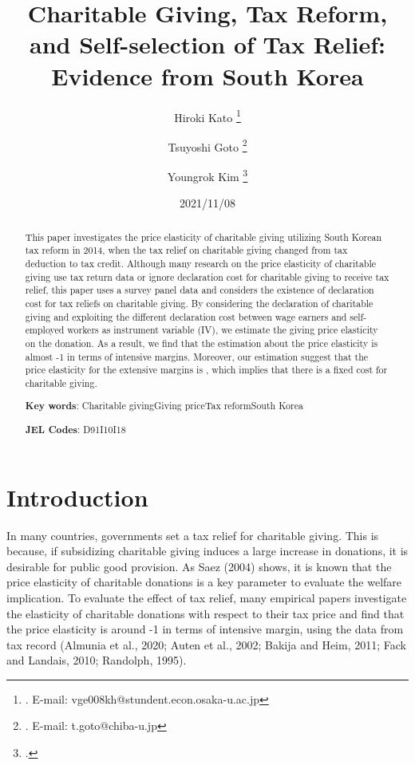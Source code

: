 \documentclass[
  11pt,
  a4paper,
]{article}
\title{Charitable Giving, Tax Reform, and Self-selection of Tax Relief: Evidence from South Korea  }
\author{
    Hiroki Kato
  \thanks{. E-mail: vge008kh@stundent.econ.osaka-u.ac.jp  }
  \and
    Tsuyoshi Goto
  \thanks{. E-mail: t.goto@chiba-u.jp  }
  \and
    Youngrok Kim
  \thanks{.  }
  \and
  }
\date{2021/11/08}
\begin{document}
\begin{spacing}{1}
  \maketitle
\end{spacing}
\begin{spacing}{1}
  \begin{abstract}
    This paper investigates the price elasticity of charitable giving utilizing South Korean tax reform in 2014, when the tax relief on charitable giving changed from tax deduction to tax credit. Although many research on the price elasticity of charitable giving use tax return data or ignore declaration cost for charitable giving to receive tax relief, this paper uses a survey panel data and considers the existence of declaration cost for tax reliefs on charitable giving.
    By considering the declaration of charitable giving and exploiting the different declaration cost between wage earners and self-employed workers as instrument variable (IV), we estimate the giving price elasticity on the donation. As a result, we find that the estimation about the price elasticity is almost -1 in terms of intensive margins.
    Moreover, our estimation suggest that the price elasticity for the extensive margins is , which implies that there is a fixed cost for charitable giving.
    
            \noindent
    \textbf{Key words}: Charitable givingGiving priceTax reformSouth Korea
        
        \noindent
    \textbf{JEL Codes}: D91I10I18
        
  \end{abstract}
\end{spacing}

\hypertarget{introduction}{%
\section{Introduction}\label{introduction}}

In many countries, governments set a tax relief for charitable giving. This is because, if subsidizing charitable giving induces a large increase in donations, it is desirable for public good provision. As Saez (2004) shows, it is known that the price elasticity of charitable donations is a key parameter to evaluate the welfare implication. To evaluate the effect of tax relief, many empirical papers investigate the elasticity of charitable donations with respect to their tax price and find that the price elasticity is around -1 in terms of intensive margin, using the data from tax record (Almunia et al., 2020; Auten et al., 2002; Bakija and Heim, 2011; Fack and Landais, 2010; Randolph, 1995).
\end{document}

